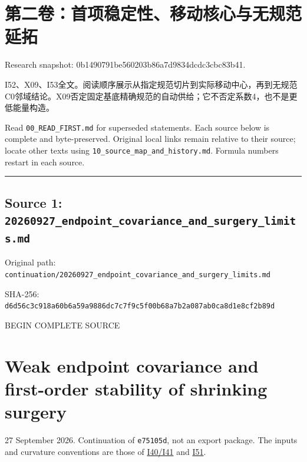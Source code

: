 \documentclass[
  10pt,
]{article}
\author{}
\date{}
\begin{document}
\hypertarget{ux7b2cux4e8cux5377ux9996ux9879ux7a33ux5b9aux6027ux79fbux52a8ux6838ux5fc3ux4e0eux65e0ux89c4ux8303ux5ef6ux62d3}{%
\section{第二卷：首项稳定性、移动核心与无规范延拓}\label{ux7b2cux4e8cux5377ux9996ux9879ux7a33ux5b9aux6027ux79fbux52a8ux6838ux5fc3ux4e0eux65e0ux89c4ux8303ux5ef6ux62d3}}

Research snapshot: 0b1490791be560203b86a7d9834dcdc3cbc83b41.

I52、X09、I53全文。阅读顺序展示从指定规范切片到实际移动中心，再到无规范C0邻域结论。X09否定固定基底精确规范的自动供给；它不否定系数4，也不是更低能量构造。

Read \nolinkurl{00_READ_FIRST.md} for superseded statements. Each source below is
complete and byte-preserved. Original local links remain relative to
their source; locate other texts using \nolinkurl{10_source_map_and_history.md}.
Formula numbers restart in each source.

\begin{center}\rule{0.5\linewidth}{0.5pt}\end{center}

\hypertarget{source-1-20260927_endpoint_covariance_and_surgery_limits.md}{%
\subsection{Source 1:
\nolinkurl{20260927_endpoint_covariance_and_surgery_limits.md}}\label{source-1-20260927_endpoint_covariance_and_surgery_limits.md}}

Original path:
\nolinkurl{continuation/20260927_endpoint_covariance_and_surgery_limits.md}

SHA-256:
\nolinkurl{d6d56c3c918a60b6a59a9886dc7c7f9c5f00b68a7b2a087ab0ca8d1e8cf2b89d}

BEGIN COMPLETE SOURCE

\hypertarget{weak-endpoint-covariance-and-first-order-stability-of-shrinking-surgery}{%
\section{Weak endpoint covariance and first-order stability of shrinking
surgery}\label{weak-endpoint-covariance-and-first-order-stability-of-shrinking-surgery}}

27 September 2026. Continuation of \texttt{e75105d}, not an export
package. The inputs and curvature conventions are those of
\href{20260927_conformal_separation_and_zero_end.md}{I40/I41} and
\href{20260927_constant_weight_and_global_fit.md}{I51}.
\end{document}
